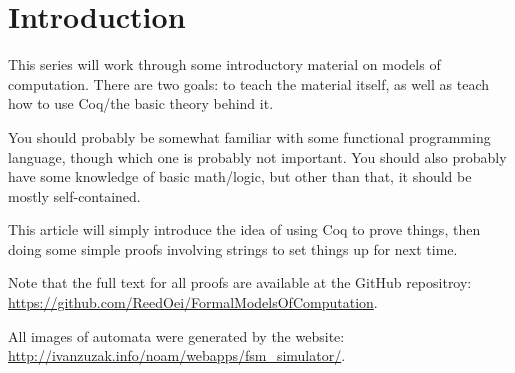 \section{Introduction}

This series will work through some introductory material on models of computation.
There are two goals: to teach the material itself, as well as teach how to use Coq/the basic theory behind it.

You should probably be somewhat familiar with some functional programming language, though which one is probably not important.
You should also probably have some knowledge of basic math/logic, but other than that, it should be mostly self-contained.

This article will simply introduce the idea of using Coq to prove things, then doing some simple proofs involving strings to set things up for next time.

Note that the full text for all proofs are available at the GitHub repositroy: \url{https://github.com/ReedOei/FormalModelsOfComputation}.

All images of automata were generated by the website: \url{http://ivanzuzak.info/noam/webapps/fsm_simulator/}.

